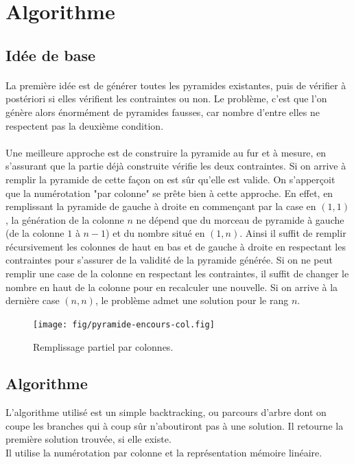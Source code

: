 \documentclass[10pt]{article}%
\begin{document}
\section{Algorithme}
\subsection*{Idée de base}
\paragraph*{}
  La première idée est de générer toutes les pyramides existantes,
  puis de vérifier à postériori si elles vérifient les contraintes ou non.
  Le problème, c'est que l'on génère alors énormément de pyramides fausses,
  car nombre d'entre elles ne respectent pas la deuxième condition.

\paragraph*{}
  Une meilleure approche est de construire la pyramide au fur et à mesure, en s'assurant
  que la partie déjà construite vérifie les deux contraintes. Si on arrive
  à remplir la pyramide de cette façon on est sûr qu'elle est valide.
  On s'apperçoit que la numérotation "par colonne" se prête bien à cette approche. En effet,
  en remplissant la pyramide de gauche à droite en commençant par la case en $(1,1)$,
  la génération de la colonne $n$ ne dépend que du morceau de pyramide à gauche (de
  la colonne $1$ à $n-1$) et du nombre situé en $(1,n)$. Ainsi il suffit de remplir récursivement
  les colonnes de haut en bas et de gauche à droite en respectant les contraintes pour s'assurer
  de la validité de la pyramide générée. Si on ne peut remplir une case de la colonne en respectant
  les contraintes, il suffit de changer le nombre en haut de la colonne pour en recalculer une nouvelle.
  Si on arrive à la dernière case $(n,n)$, le problème admet une solution pour le rang $n$.


\begin{figure}[h]
    \centering
    \texttt{[image: fig/pyramide-encours-col.fig]}
    \caption{Remplissage partiel par colonnes.}
    \label{fig:encours:col}
\end{figure}

\subsection*{Algorithme}
  L'algorithme utilisé est un simple backtracking, ou parcours d'arbre dont
  on coupe les branches qui à coup sûr n'aboutiront pas à une solution.
  Il retourne la première solution trouvée, si elle existe.\\
  Il utilise la numérotation par colonne et la représentation mémoire linéaire.
\end{document}
